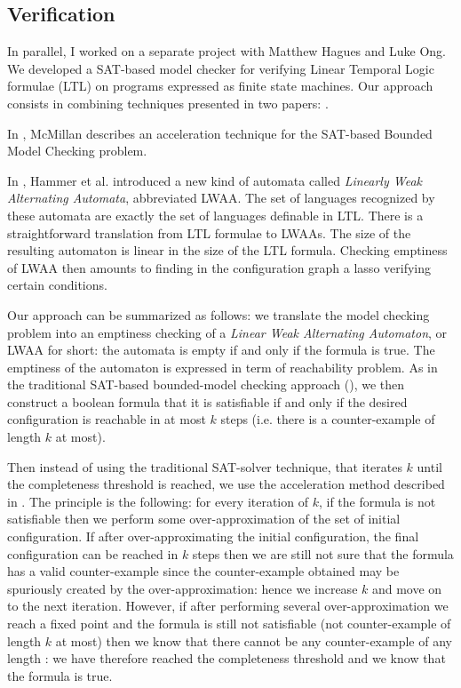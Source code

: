 \subsection{Verification}

In parallel, I worked on a separate project with Matthew Hagues and
Luke Ong. We developed a SAT-based  model checker for verifying
Linear Temporal Logic formulae (LTL) on programs expressed as finite
state machines. Our approach consists in combining techniques
presented in two papers: \cite{hammer:truly,
DBLP:conf/cav/McMillan03}.

In \cite{DBLP:conf/cav/McMillan03}, McMillan describes an
acceleration technique for the SAT-based Bounded Model Checking
problem.

In \citep{hammer:truly}, Hammer et al. introduced a new kind of
automata called \emph{Linearly Weak Alternating Automata},
abbreviated LWAA. The set of languages recognized by these automata
are exactly the set of languages definable in LTL. There is a
straightforward translation from LTL formulae to LWAAs. The size of
the resulting automaton is linear in the size of the LTL formula.
Checking emptiness of LWAA then amounts to finding in the
configuration graph a lasso verifying certain conditions.

Our approach can be summarized as follows: we translate the model
checking problem into an emptiness checking of a \emph{Linear Weak
Alternating Automaton}, or LWAA for short: the automata is empty if
and only if the formula is true. The emptiness of the automaton is
expressed in term of reachability problem. As in the traditional
SAT-based bounded-model checking approach (\cite{biere99symbolic}),
we then construct a boolean formula that it is satisfiable if and
only if the desired configuration is reachable in at most $k$ steps
(i.e. there is a counter-example of length $k$ at most).

Then instead of using the traditional SAT-solver technique, that
iterates $k$ until the completeness threshold is reached, we use the
acceleration method described in \cite{DBLP:conf/cav/McMillan03}.
The principle is the following: for every iteration of $k$, if the
formula is not satisfiable then we perform some over-approximation
of the set of initial configuration. If after over-approximating the
initial configuration, the final configuration can be reached in $k$
steps then we are still not sure that the formula has a valid
counter-example since the counter-example obtained may be spuriously
created by the over-approximation: hence we increase $k$ and move on
to the next iteration. However, if after performing several
over-approximation we reach a fixed point and the formula is still
not satisfiable (not counter-example of length $k$ at most) then we
know that there cannot be any counter-example of any length : we
have therefore reached the completeness threshold and we know that
the formula is true.


